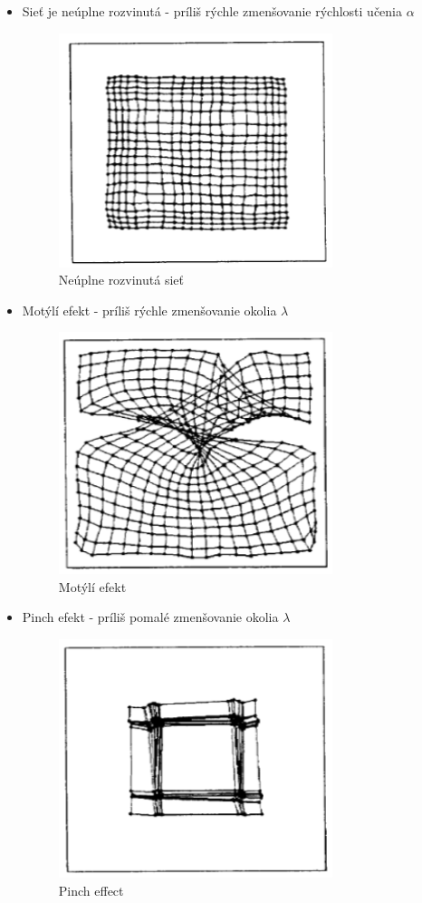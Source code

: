 \begin{itemize}
	\item Sieť je neúplne rozvinutá - príliš rýchle zmenšovanie rýchlosti učenia $\alpha$
	\begin{figure}[H]
		\centering
		\includegraphics[width=8cm]{assets/too_fast}
		\caption{Neúplne rozvinutá sieť \protect\cite{stefankouvod}}
	\end{figure}
	
	\item Motýlí efekt - príliš rýchle zmenšovanie okolia $\lambda$
	\begin{figure}[H]
		\centering
		\includegraphics[width=8cm]{assets/butterfly_effect}
		\caption{Motýlí efekt \protect\cite{stefankouvod}}
	\end{figure}
	
	\item Pinch efekt - príliš pomalé zmenšovanie okolia $\lambda$
	\begin{figure}[H]
		\centering
		\includegraphics[width=8cm]{assets/pinch_effect}
		\caption{Pinch effect \protect\cite{stefankouvod}}
	\end{figure}
\end{itemize}

